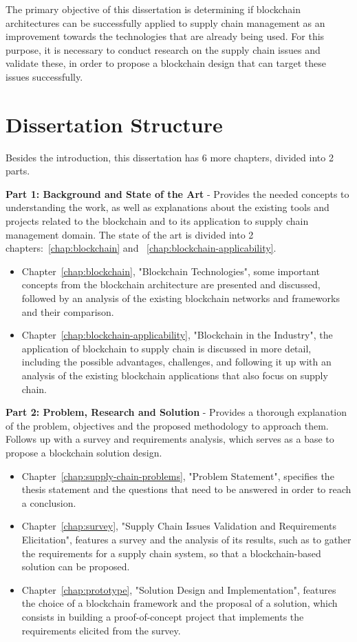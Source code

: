 The primary objective of this dissertation is determining if blockchain architectures can be successfully applied to supply chain management as an improvement towards the technologies that are already being used. For this purpose, it is necessary to conduct research on the supply chain issues and validate these, in order to propose a blockchain design that can target these issues successfully. 

\section{Dissertation Structure} \label{sec:struct}

Besides the introduction, this dissertation has 6 more chapters, divided into 2 parts.

\par \textbf{Part 1: Background and State of the Art} - Provides the needed concepts to understanding the work, as well as explanations about the existing tools and projects related to the blockchain and to its application to supply chain management domain.
 The state of the art is divided into 2 chapters:~\ref{chap:blockchain} and ~\ref{chap:blockchain-applicability}.
\begin{itemize}
  \item Chapter~\ref{chap:blockchain}, "Blockchain Technologies", some important concepts from the blockchain architecture are presented and discussed, followed by an analysis of the existing blockchain networks and frameworks and their comparison.
  \item Chapter~\ref{chap:blockchain-applicability}, "Blockchain in the Industry", the application of blockchain to supply chain is discussed in more detail, including the possible advantages, challenges, and following it up with an analysis of the existing blockchain applications that also focus on supply chain. 
\end{itemize}

\par \textbf{Part 2: Problem, Research and Solution} - Provides a thorough explanation of the problem, objectives and the proposed methodology to approach them. Follows up with a survey and requirements analysis, which serves as a base to propose a blockchain solution design. 
\begin{itemize}
  \item Chapter~\ref{chap:supply-chain-problems}, "Problem Statement", specifies the thesis statement and the questions that need to be answered in order to reach a conclusion.
  \item Chapter~\ref{chap:survey}, "Supply Chain Issues Validation and Requirements Elicitation", features a survey and the analysis of its results, such as to gather the requirements for a supply chain system, so that a blockchain-based solution can be proposed.
  \item Chapter~\ref{chap:prototype}, "Solution Design and Implementation", features the choice of a blockchain framework and the proposal of a solution, which consists in building a proof-of-concept project that implements the requirements elicited from the survey.
\end{itemize}

